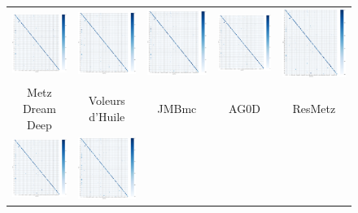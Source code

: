 \documentclass{article}
\begin{document}
\begin{figure}
\begin{tabular}{ccccc}
		\includegraphics[width=0.18\columnwidth]{figs/confusion_matrix_MetzDreamDeep.png}&
		\includegraphics[width=0.18\columnwidth]{figs/confusion_matrix_voleursDhuile.png}&
		\includegraphics[width=0.18\columnwidth]{figs/confusion_matrix_JMBmc.png}&
		\includegraphics[width=0.18\columnwidth]{figs/confusion_matrix_AG0D.png}&
        \includegraphics[width=0.18\columnwidth]{figs/confusion_matrix_ResMetz.png}\\
        Metz Dream Deep & Voleurs d'Huile & JMBmc & AG0D & ResMetz \\
		\includegraphics[width=0.18\columnwidth]{figs/confusion_matrix_CelestineFeuillat.png}&
		\includegraphics[width=0.18\columnwidth]{figs/confusion_matrix_LesJongleurs.png}&

\end{tabular}
\end{figure}
\end{document}
